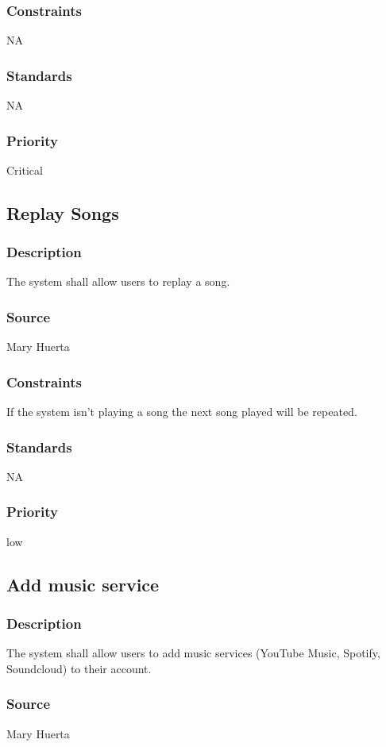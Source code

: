 \subsubsection{Constraints}
NA
\subsubsection{Standards}
NA
\subsubsection{Priority}
Critical



\subsection{Replay Songs}
\subsubsection{Description}
The system shall allow users to replay a song.
\subsubsection{Source}
Mary Huerta
\subsubsection{Constraints}
If the system isn't playing a song the next song played will be repeated. 
\subsubsection{Standards}
NA
\subsubsection{Priority}
low



\subsection{Add music service}
\subsubsection{Description}
The system shall allow users to add music services (YouTube Music, Spotify, Soundcloud) to their account.
\subsubsection{Source}
Mary Huerta
